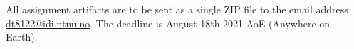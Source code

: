 \documentclass[a4paper, 12pt]{article}
\begin{document}
All assignment artifacts are to be sent as a single ZIP file to the email address
\href{mailto:dt8122@idi.ntnu.no}{dt8122@idi.ntnu.no}. The deadline is August 18th 2021 AoE
(Anywhere on Earth).




\end{document}
